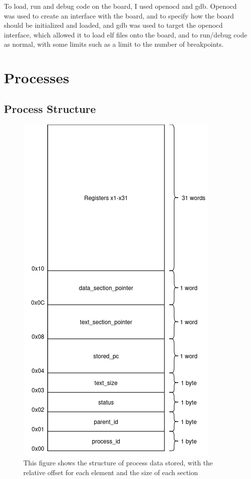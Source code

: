 To load, run and debug code on the board, I used openocd and gdb. Openocd was used to create an interface with the board, and to specify how the board should be initialized and loaded, and gdb was used to target the openocd interface, which allowed it to load elf files onto the board, and to run/debug code as normal, with some limits such as a limit to the number of breakpoints.

\section{Processes}
\subsection{Process Structure}
\begin{figure}[H]
    \includegraphics[height=0.6\textheight]{figures/process_structure.png}
    \centering
    \caption[Process Structure]{This figure shows the structure of process data stored, with the relative offset for each element and the size of each section}
    \label{fig:proc_struc}
\end{figure}

